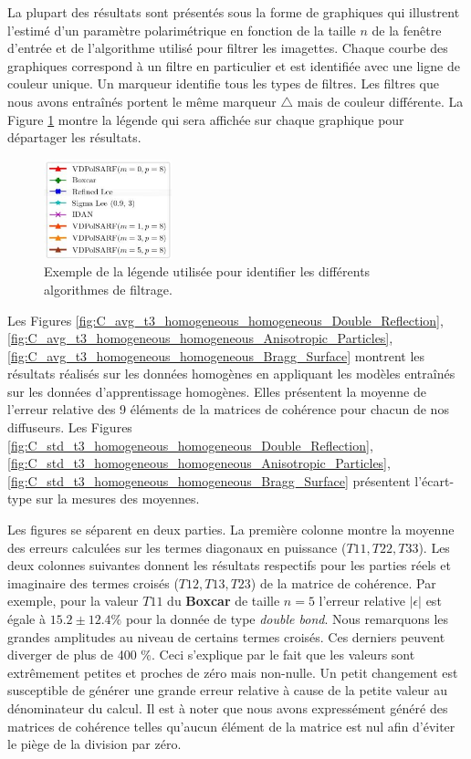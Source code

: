La plupart des résultats sont présentés sous la forme de graphiques qui illustrent l'estimé d'un paramètre polarimétrique en fonction de la taille $n$ de la fenêtre d'entrée et de l'algorithme utilisé pour filtrer les imagettes. Chaque courbe des graphiques correspond à un filtre en particulier et est identifiée avec une ligne de couleur unique. Un marqueur identifie tous les types de filtres. Les filtres que nous avons entraînés portent le même marqueur $\triangle$ mais de couleur différente. La Figure \ref{fig:legend_fig} montre la légende qui sera affichée sur chaque graphique pour départager les résultats.

\begin{figure}[!htbp] 
\includegraphics[width=0.33\textwidth]{figures/Chap4/results/legende.jpg}
 \centering
  \caption{
  \small{Exemple de la légende utilisée pour identifier les différents algorithmes de filtrage.
  }}
  \label{fig:legend_fig}
\end{figure}

Les Figures \ref{fig:C_avg_t3_homogeneous_homogeneous_Double_Reflection}, \ref{fig:C_avg_t3_homogeneous_homogeneous_Anisotropic_Particles}, \ref{fig:C_avg_t3_homogeneous_homogeneous_Bragg_Surface} montrent les résultats réalisés sur les données homogènes en appliquant les modèles entraînés sur les données d'apprentissage homogènes. Elles présentent la moyenne de l'erreur relative des 9 éléments de la matrices de cohérence pour chacun de nos diffuseurs. Les Figures \ref{fig:C_std_t3_homogeneous_homogeneous_Double_Reflection}, \ref{fig:C_std_t3_homogeneous_homogeneous_Anisotropic_Particles}, \ref{fig:C_std_t3_homogeneous_homogeneous_Bragg_Surface} présentent l'écart-type sur la mesures des moyennes.  

Les figures se séparent en deux parties. La première colonne montre la moyenne des erreurs calculées sur les termes diagonaux en puissance ($T11, T22, T33$). Les deux colonnes suivantes donnent les résultats respectifs pour les parties réels et imaginaire des termes croisés ($T12, T13, T23$) de la matrice de cohérence.  Par exemple, pour la valeur $T11$ du \textbf{Boxcar} de taille $n=5$ l'erreur relative $|\epsilon|$ est égale à $15.2 \pm 12.4 \%$ pour la donnée de type \textit{double bond}. Nous remarquons les grandes amplitudes au niveau de certains termes croisés. Ces derniers peuvent diverger de plus de 400 \%. Ceci s'explique par le fait que les valeurs sont extrêmement petites et proches de zéro mais non-nulle. Un petit changement est susceptible de générer une grande erreur relative à cause de la petite valeur au dénominateur du calcul. Il est à noter que nous avons expressément généré des matrices de cohérence telles qu'aucun élément de la matrice est nul afin d'éviter le piège de la division par zéro.

